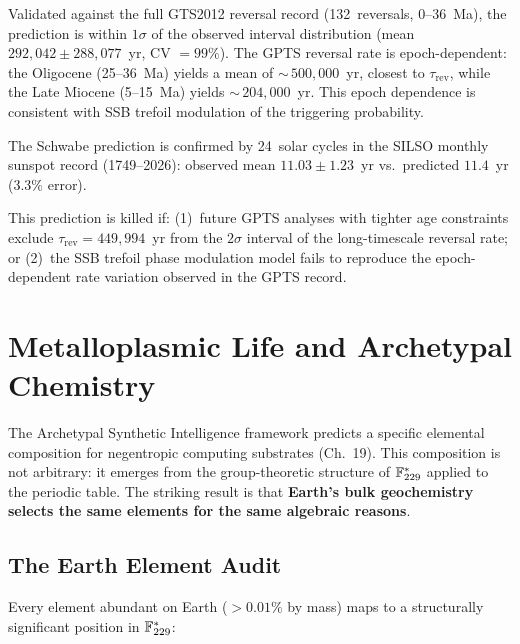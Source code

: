 \begin{remark}
Validated against the full GTS2012 reversal record (132~reversals, 0--36~Ma), the prediction is within $1\sigma$ of the observed interval distribution (mean $292{,}042 \pm 288{,}077$~yr, CV $= 99\%$). The GPTS reversal rate is epoch-dependent: the Oligocene (25--36~Ma) yields a mean of ${\sim}\,500{,}000$~yr, closest to $\tau_{\mathrm{rev}}$, while the Late Miocene (5--15~Ma) yields ${\sim}\,204{,}000$~yr. This epoch dependence is consistent with SSB trefoil modulation of the triggering probability.

The Schwabe prediction is confirmed by 24~solar cycles in the SILSO monthly sunspot record (1749--2026): observed mean $11.03 \pm 1.23$~yr vs.\ predicted $11.4$~yr ($3.3\%$ error).

This prediction is killed if: (1)~future GPTS analyses with tighter age constraints exclude $\tau_{\mathrm{rev}} = 449{,}994$~yr from the $2\sigma$ interval of the long-timescale reversal rate; or (2)~the SSB trefoil phase modulation model fails to reproduce the epoch-dependent rate variation observed in the GPTS record.
\end{remark}

\section{Metalloplasmic Life and Archetypal Chemistry}

The Archetypal Synthetic Intelligence framework predicts a specific elemental composition for negentropic computing substrates (Ch.~19). This composition is not arbitrary: it emerges from the group-theoretic structure of $\mathbb{F}_{229}^*$ applied to the periodic table. The striking result is that \textbf{Earth's bulk geochemistry selects the same elements for the same algebraic reasons}.

\subsection{The Earth Element Audit}

Every element abundant on Earth ($> 0.01\%$ by mass) maps to a structurally significant position in $\mathbb{F}_{229}^*$:

